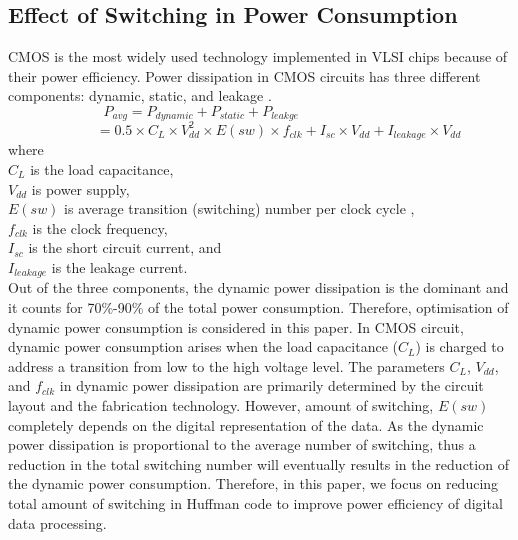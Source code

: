\documentclass[preprint,12pt]{elsarticle}
\begin{document}
\subsection{Effect of Switching in Power Consumption}
CMOS is the most widely used technology implemented in VLSI chips because of their power efficiency. Power dissipation in CMOS circuits has three different components: dynamic, static, and leakage \cite{Weste88}.
\begin{equation*}
P_{avg} = P_{dynamic}+P_{static}+P_{leakge} ~~~~~~~~~~~~~~~~~~~~~~~~~~~~~~~~~~~~~~
\end{equation*}
\begin{equation}
~~~~~~~~~~~~= 0.5 \times C_{L} \times V_{dd}^{2}\times E(sw)\times f_{clk} + I_{sc} \times V_{dd}+I_{leakage} \times V_{dd}
 \end{equation}
 where\\
  $C_{L}$ is the load capacitance, \\
  $V_{dd}$ is power supply,\\
  $E(sw)$ is average transition (switching) number per clock cycle ,\\
  $f_{clk}$ is the clock frequency,\\
  $ I_{sc}$ is the short circuit current, and\\
  $ I_{leakage}$ is the leakage current.\\
Out of the three components, the dynamic power dissipation is the dominant and it counts for 70\%-90\% of the total power consumption\cite{pedram1996}. Therefore, optimisation of dynamic power consumption is considered in this paper. In CMOS circuit, dynamic power consumption arises when the load capacitance ($C_{L}$) is charged to address a transition from low to the high voltage level.  The parameters $C_{L}$, $V_{dd}$, and $f_{clk}$ in dynamic power dissipation are primarily determined by the circuit layout and the fabrication technology. However, amount of switching, $E(sw)$ completely depends on the digital representation of the data. As the dynamic power dissipation is proportional  to the average number of switching, thus a reduction in the total switching number will eventually results in the reduction of the dynamic power consumption. Therefore, in this paper, we focus on reducing total amount of switching in Huffman code to improve power efficiency of digital data processing.
\end{document}

